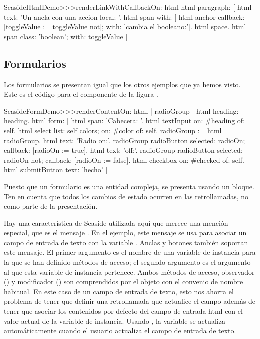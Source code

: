 \documentclass[a4paper,10pt,twoside]{book}
\begin{document}
\begin{code}{}
SeasideHtmlDemo>>>renderLinkWithCallbackOn: html 
	html paragraph: [
		html text: 'Un ancla con una accion local: '.
		html span with: [
			html anchor
				callback: [toggleValue := toggleValue not];
				with: 'cambia el booleano:'].
		html space.
		html span
			class: 'boolean';
			with: toggleValue ]
\end{code}


\subsection{Formularios}

Los formularios se presentan igual que los otros ejemplos que ya hemos visto.
Este es el código para el componente  de la figura .

\begin{code}{}
SeasideFormDemo>>>renderContentOn: html
	| radioGroup |
	html heading: heading.
	html form: [
		html span: 'Cabecera: '.
		html textInput on: #heading of: self.
		html select
			list: self colors;
			on: #color of: self.
		radioGroup := html radioGroup.
		html text: 'Radio on:'.
		radioGroup radioButton
			selected: radioOn;
			callback: [radioOn := true].
		html text: 'off:'.
		radioGroup radioButton
			selected: radioOn not;
			callback: [radioOn := false].
		html checkbox on: #checked of: self.
		html submitButton
			text: 'hecho' ]
\end{code}{}

Puesto que un formulario es una entidad compleja, se presenta usando un bloque.
Ten en cuenta que todos los cambios de estado ocurren en las retrollamadas, no como parte de la presentación.

Hay una característica de Seaside utilizada aquí que merece una mención especial, que es el mensaje .
En el ejemplo, este mensaje se usa para asociar un campo de entrada de texto con la variable .
Anclas y botones también soportan este mensaje.
El primer argumento es el nombre de una variable de instancia para la que se han definido métodos de acceso; el segundo argumento es el argumento al que esta variable de instancia pertenece.
Ambos métodos de acceso, observador () y modificador () son comprendidos por el objeto con el convenio de nombre habitual.
En este caso de un campo de entrada de texto, esto nos ahorra el problema de tener que definir una retrollamada que actualice el campo además de tener que asociar los contenidos por defecto del campo de entrada html con el valor actual de la variable de instancia.
Usando , la variable  se actualiza automáticamente cuando el usuario actualiza el campo de entrada de texto.
\end{document}
